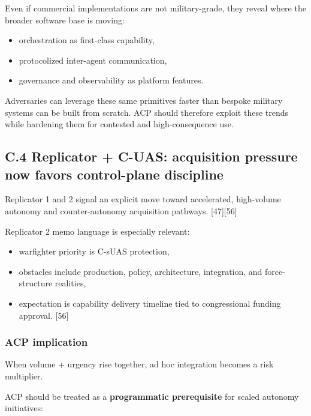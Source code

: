 \documentclass[
]{article}
\providecommand{\tightlist}{%
  \setlength{\itemsep}{0pt}\setlength{\parskip}{0pt}}
\begin{document}
Even if commercial implementations are not military-grade, they reveal
where the broader software base is moving:

\begin{itemize}
\tightlist
\item
  orchestration as first-class capability,
\item
  protocolized inter-agent communication,
\item
  governance and observability as platform features.
\end{itemize}

Adversaries can leverage these same primitives faster than bespoke
military systems can be built from scratch. ACP should therefore exploit
these trends while hardening them for contested and high-consequence
use.

\hypertarget{c.4-replicator-c-uas-acquisition-pressure-now-favors-control-plane-discipline}{%
\subsection{C.4 Replicator + C-UAS: acquisition pressure now favors
control-plane
discipline}\label{c.4-replicator-c-uas-acquisition-pressure-now-favors-control-plane-discipline}}

Replicator 1 and 2 signal an explicit move toward accelerated,
high-volume autonomy and counter-autonomy acquisition pathways.
{[}47{]}{[}56{]}

Replicator 2 memo language is especially relevant:

\begin{itemize}
\tightlist
\item
  warfighter priority is C-sUAS protection,
\item
  obstacles include production, policy, architecture, integration, and
  force-structure realities,
\item
  expectation is capability delivery timeline tied to congressional
  funding approval. {[}56{]}
\end{itemize}

\hypertarget{acp-implication-2}{%
\subsubsection{ACP implication}\label{acp-implication-2}}

When volume + urgency rise together, ad hoc integration becomes a risk
multiplier.

ACP should be treated as a \textbf{programmatic prerequisite} for scaled
autonomy initiatives:
\end{document}
